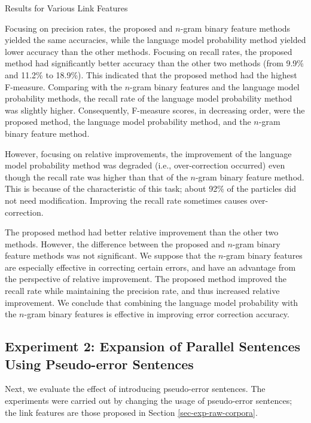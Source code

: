\documentclass[english]{jnlp_1.4_rep}
\begin{document}
\begin{table}[b]
\caption{Results for Various Link Features}
\label{tbl-exp-results}

\end{table}

Focusing on precision rates, the proposed and $n$-gram binary feature
methods yielded the same accuracies, while the language model
probability method yielded lower accuracy than the other
methods. Focusing on recall rates, the proposed method had
significantly better accuracy than the other two methods (from 9.9\%
and 11.2\% to 18.9\%). This indicated that the proposed method had the
highest F-measure. Comparing with the $n$-gram binary features and the
language model probability methods, the recall rate of the language
model probability method was slightly higher. Consequently, F-measure
scores, in decreasing order, were the proposed method, the language
model probability method, and the $n$-gram binary feature method.

However, focusing on relative improvements, the improvement of the
language model probability method was degraded (i.e., over-correction
occurred) even though the recall rate was higher than that of the
$n$-gram binary feature method. This is because of the characteristic
of this task; about 92\% of the particles did not need
modification. Improving the recall rate sometimes causes
over-correction.

The proposed method had better relative improvement than the other two
methods. However, the difference between the proposed and $n$-gram
binary feature methods was not significant. We suppose that the
$n$-gram binary features are especially effective in correcting
certain errors, and have an advantage from the perspective of relative
improvement. The proposed method improved the recall rate while
maintaining the precision rate, and thus increased relative
improvement. We conclude that combining the language model probability
with the $n$-gram binary features is effective in improving error
correction accuracy.


\subsection{Experiment 2: Expansion of Parallel Sentences Using
Pseudo-error Sentences}
\label{sec-exp-adaptation}

Next, we evaluate the effect of introducing pseudo-error
sentences. The experiments were carried out by changing the usage of
pseudo-error sentences; the link features are those proposed in
Section \ref{sec-exp-raw-corpora}.
\end{document}
